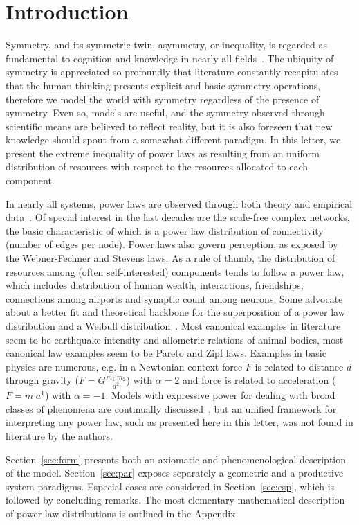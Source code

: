 \documentclass[a4paper, 11pt]{article} %
\begin{document}
\section{Introduction}
Symmetry, and its symmetric twin, asymmetry, or inequality,
is regarded as fundamental to cognition 
and knowledge in nearly all fields~\cite{deleuze,part}.
The ubiquity of symmetry is appreciated so profoundly that
literature constantly recapitulates that 
the human thinking presents
explicit and basic symmetry operations,
therefore we model the world with symmetry
regardless of the presence of symmetry.
Even so, models are useful, and the symmetry observed through scientific
means are believed to reflect reality, but it is also foreseen
that new knowledge should spout from a somewhat different paradigm.
In this letter, we present the extreme inequality
of power laws as resulting from
an uniform distribution of resources with
respect to the resources allocated 
to each component.

In nearly all systems, power laws are observed through both theory and empirical data~\cite{newman}.
Of special interest in the last decades are the scale-free complex networks,
the basic characteristic of which is a power law distribution of connectivity (number of edges per node).
Power laws also govern perception, as exposed by the Webner-Fechner and Stevens laws.
As a rule of thumb, the distribution of resources among (often self-interested) components
tends to follow a power law,
which includes distribution of human wealth, interactions, friendships;
connections among airports and synaptic count among neurons.
Some advocate 
about a better fit and theoretical backbone for the superposition of a
power law distribution and a Weibull distribution~\cite{powWeib}.
Most canonical examples in literature seem to be earthquake intensity and allometric relations of animal bodies,
most canonical law examples seem to be Pareto and Zipf laws.
Examples in basic physics are numerous, e.g. in a Newtonian context force $F$ is related to distance $d$ through gravity
($F=G\frac{m_1\;m_2}{d^2}$)
with $\alpha=2$ 
and force is related to acceleration
($F=m\;a^1$) 
with $\alpha=-1$.
Models with expressive power for dealing with broad classes of phenomena
are continually discussed~\cite{part,pbook}, 
but an unified framework for interpreting any power law,
such as presented here in this letter,
was not found in literature by the authors.

Section~\ref{sec:form} presents both an axiomatic and phenomenological
description of the model.
Section~\ref{sec:par} exposes separately a geometric and a productive system
paradigms.
Especial cases are considered in Section~\ref{sec:esp},
which is followed by concluding remarks.
The most elementary mathematical description 
of power-law distributions is outlined in the
Appendix.
\end{document}
